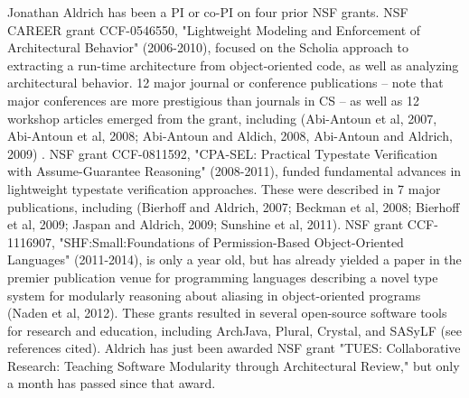 \documentclass[11pt,letterpaper]{article}
\begin{document}
Jonathan Aldrich has been a PI or co-PI on four prior NSF grants.  NSF CAREER grant CCF-0546550, "Lightweight Modeling and Enforcement of Architectural Behavior" (2006-2010), focused on the Scholia approach to extracting a run-time architecture from object-oriented code, as well as analyzing architectural behavior.  12 major journal or conference publications -- note that major conferences are more prestigious than journals in CS -- as well as 12 workshop articles emerged from the grant, including (Abi-Antoun et al, 2007, Abi-Antoun et al, 2008; Abi-Antoun and Aldich, 2008, Abi-Antoun and Aldrich, 2009) .  NSF grant CCF-0811592, "CPA-SEL: Practical Typestate Verification with Assume-Guarantee Reasoning" (2008-2011), funded fundamental advances in lightweight typestate verification approaches.  These were described in 7 major publications, including (Bierhoff and Aldrich, 2007; Beckman et al, 2008; Bierhoff et al, 2009; Jaspan and Aldrich, 2009; Sunshine et al, 2011).  NSF grant CCF-1116907, "SHF:Small:Foundations of Permission-Based Object-Oriented Languages" (2011-2014), is only a year old, but has already yielded a paper in the premier publication venue for programming languages describing a novel type system for modularly reasoning about aliasing in object-oriented programs (Naden et al, 2012).  These grants resulted in several open-source software tools for research and education, including ArchJava, Plural, Crystal, and SASyLF (see references cited).  Aldrich has just been awarded NSF grant "TUES: Collaborative Research: Teaching Software Modularity through Architectural Review," but only a month has passed since that award. 

\listoftodos
\end{document}
